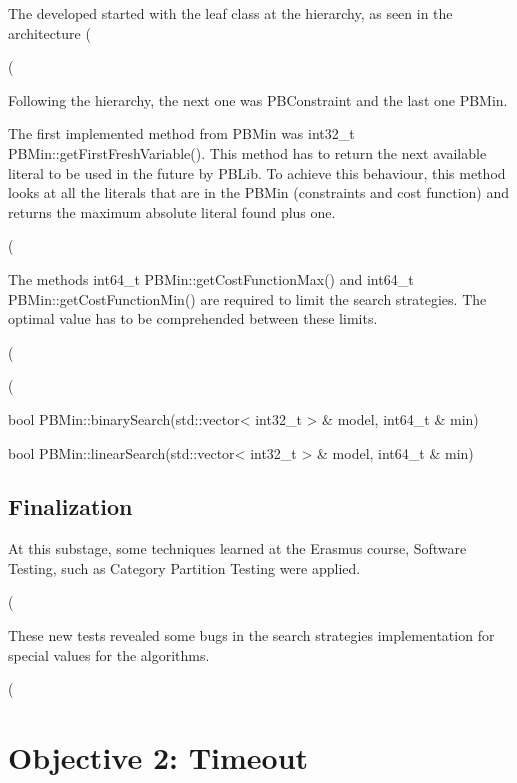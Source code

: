 The developed started with the leaf class at the hierarchy, as seen in the architecture (%



(%

Following the hierarchy, the next one was PBConstraint and the last one PBMin. 



The first implemented method from PBMin was int32\_t PBMin::getFirstFreshVariable(). This method has to return the next available literal to be used in the future by PBLib. To achieve this behaviour, this method looks at all the literals that are in the PBMin (constraints and cost function) and returns the maximum absolute literal found plus one.  

(%



The methods int64\_t PBMin::getCostFunctionMax() and int64\_t PBMin::getCostFunctionMin() are required to limit the search strategies. The optimal value has to be comprehended between these limits.  

(%

(%



bool PBMin::binarySearch(std::vector< int32\_t > \& model, int64\_t \& min) 



bool PBMin::linearSearch(std::vector< int32\_t > \& model, int64\_t \& min) 

\subsection{Finalization}

At this substage, some techniques learned at the Erasmus course, Software Testing, such as Category Partition Testing were applied.  

(%

These new tests revealed some bugs in the search strategies implementation for special values for the algorithms. 

(%

\section{Objective 2: Timeout}

